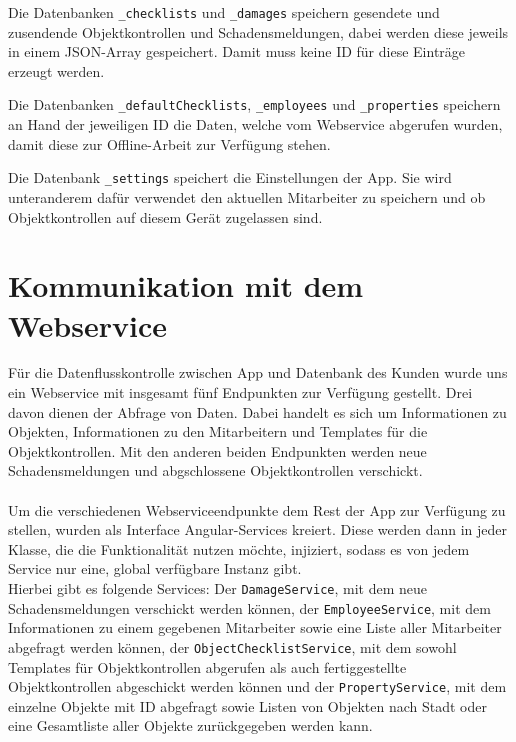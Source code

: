 \documentclass[12pt]{article}
\begin{document}
Die Datenbanken \texttt{\_checklists} und \texttt{\_damages} speichern gesendete und zusendende Objektkontrollen und Schadensmeldungen, dabei werden diese jeweils in einem JSON-Array gespeichert. Damit muss keine ID für diese Einträge erzeugt werden.

Die Datenbanken \texttt{\_defaultChecklists}, \texttt{\_employees} und \texttt{\_properties} speichern an Hand der jeweiligen ID die Daten, welche vom Webservice abgerufen wurden, damit diese zur Offline-Arbeit zur Verfügung stehen.

Die Datenbank \texttt{\_settings} speichert die Einstellungen der App. Sie wird unteranderem dafür verwendet den aktuellen Mitarbeiter zu speichern und ob Objektkontrollen auf diesem Gerät zugelassen sind.

\section{Kommunikation mit dem Webservice}
Für die Datenflusskontrolle zwischen App und Datenbank des Kunden wurde uns ein Webservice mit insgesamt fünf Endpunkten zur Verfügung gestellt. Drei davon dienen der Abfrage von Daten. Dabei handelt es sich um Informationen zu Objekten, Informationen zu den Mitarbeitern und Templates für die Objektkontrollen. Mit den anderen beiden Endpunkten werden neue Schadensmeldungen und abgschlossene Objektkontrollen verschickt.

\paragraph{}Um die verschiedenen Webserviceendpunkte dem Rest der App zur Verfügung zu stellen, wurden als Interface Angular-Services kreiert. Diese werden dann in jeder Klasse, die die Funktionalität nutzen möchte, injiziert, sodass es von jedem Service nur eine, global verfügbare Instanz gibt.\\
Hierbei gibt es folgende Services: Der \texttt{DamageService}, mit dem neue Schadensmeldungen verschickt werden können, der \texttt{EmployeeService}, mit dem Informationen zu einem gegebenen Mitarbeiter sowie eine Liste aller Mitarbeiter abgefragt werden können, der \texttt{ObjectChecklistService}, mit dem sowohl Templates für Objektkontrollen abgerufen als auch fertiggestellte Objektkontrollen abgeschickt werden können und der \texttt{PropertyService}, mit dem einzelne Objekte mit ID abgefragt sowie Listen von Objekten nach Stadt oder eine Gesamtliste aller Objekte zurückgegeben werden kann.
\end{document}

